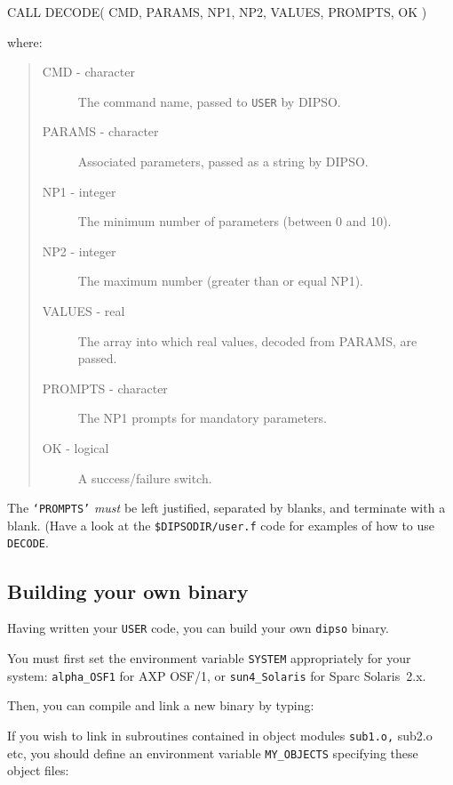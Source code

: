 \documentclass[twoside,11pt,noabs,nolof]{starlink}
\begin{document}
\begin{terminalv}
      CALL DECODE( CMD, PARAMS, NP1, NP2, VALUES, PROMPTS, OK )
\end{terminalv}

where:

\begin{quote}
\begin{description}
\item [CMD - character] The command name, passed to {\texttt{USER}}  by DIPSO.
\item [PARAMS - character]  Associated parameters, passed as a string by
DIPSO.
\item [NP1 - integer] The minimum number of parameters (between 0 and 10).
\item [NP2 - integer] The maximum number (greater than or equal NP1).
\item [VALUES - real] The array into which real values, decoded from PARAMS,
are passed.
\item [PROMPTS - character] The NP1 prompts for mandatory parameters.
\item [OK - logical] A success/failure switch.
\end{description}
\end{quote}

The {\texttt{`PROMPTS'}}  \emph{must} be left justified, separated by blanks,
and terminate with a blank. (Have a look at the
{\texttt{\$DIPSODIR/user.f}}  code for examples of how to use {\texttt{DECODE}}.

\subsection {\label{SEC:MY_DIPSO}Building your own binary}

Having written your {\texttt{USER}}  code, you can build your own {\texttt{dipso}}
binary.

You must first set the environment variable {\texttt{SYSTEM}}  appropriately
for your system: {\texttt{alpha\_OSF1}}  for AXP OSF/1, or {\texttt{sun4\_Solaris}}  for
Sparc Solaris~2.x.

Then, you can compile and link a new binary by typing:

\begin{terminalv}
\end{terminalv}

If you wish to link in subroutines contained in object modules {\texttt{sub1.o,}
sub2.o} etc, you should define an environment variable {\texttt{MY\_OBJECTS}}
specifying these object files:
\end{document}
